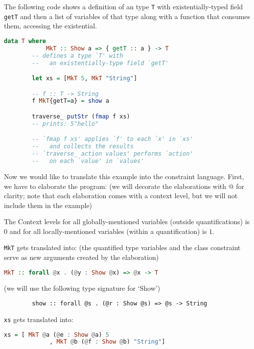 \begin{ex}[Existentials]
    The following code shows a definition of an type \lstinline{T} with existentially-typed field \lstinline{getT} and then a list of variables of that type along with a function that consumes them, accessing the existential. 

    \begin{lstlisting}[language=Haskell]
        data T where
            MkT :: Show a => { getT :: a } -> T
        -- defines a type `T' with
        --   an existentially-type field `getT'

        let xs = [MkT 5, MkT "String"]

        -- f :: T -> String
        f MkT{getT=a} = show a

        traverse_ putStr (fmap f xs)
        -- prints: 5"hello"

        -- `fmap f xs' applies `f' to each `x' in `xs'
        --   and collects the results
        -- `traverse_ action values' performs `action'
        --   on each `value' in `values'
    \end{lstlisting}

    Now we would like to translate this example into the constraint language. First, we have to elaborate the program: (we will decorate the elaborations with $@$ for clarity; note that each elaboration comes with a context level, but we will not include them in the example)

    The Context levels for all globally-mentioned variables (outside quantifications) is $0$ and for all locally-mentioned variables (within a quantification) is $1$.

    \lstinline{MkT} gets translated into: (the quantified type variables and the class constraint serve as new arguments created by the elaboration)
    \begin{lstlisting}[language=Haskell]
        MkT :: forall @x . (@y : Show @x) => @x -> T
    \end{lstlisting}

    (we will use the following type signature for `Show')
    \begin{lstlisting}
        show :: forall @s . (@r : Show @s) => @s -> String
    \end{lstlisting}

    \lstinline{xs} gets translated into: 

    \begin{lstlisting}[language=Haskell]
        xs = [ MkT @a (@e : Show @a) 5
             , MkT @b (@f : Show @b) "String"]
    \end{lstlisting}


\end{ex}
